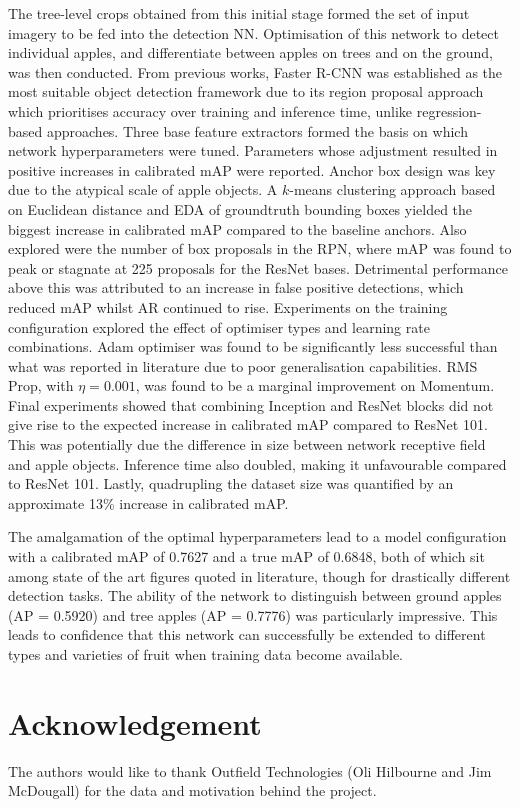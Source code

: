 \documentclass[journal]{IEEEtran}
\begin{document}
The tree-level crops obtained from this initial stage formed the set of input imagery to be fed into the detection NN. Optimisation of this network to detect individual apples, and differentiate between apples on trees and on the ground, was then conducted. 
From previous works, Faster R-CNN was established as the most suitable object detection framework due to its region proposal approach which prioritises accuracy over training and inference time, unlike regression-based approaches. Three base feature extractors formed the basis on which network hyperparameters were tuned. Parameters whose adjustment resulted in positive increases in calibrated mAP were reported. Anchor box design was key due to the atypical scale of apple objects. A $k$-means clustering approach based on Euclidean distance and EDA of groundtruth bounding boxes yielded the biggest increase in calibrated mAP compared to the baseline anchors. Also explored were the number of box proposals in the RPN, where mAP was found to peak or stagnate at 225 proposals for the ResNet bases. Detrimental performance above this was attributed to an increase in false positive detections, which reduced mAP whilst AR continued to rise. Experiments on the training configuration explored the effect of optimiser types and learning rate combinations. Adam optimiser was found to be significantly less successful than what was reported in literature due to poor generalisation capabilities. RMS Prop, with $\eta=0.001$, was found to be a marginal improvement on Momentum. Final experiments showed that combining Inception and ResNet blocks did not give rise to the expected increase in calibrated mAP compared to ResNet 101. This was potentially due the difference in size between network receptive field and apple objects. Inference time also doubled, making it unfavourable compared to ResNet 101. Lastly, quadrupling the dataset size was quantified by an approximate 13\% increase in calibrated mAP.

The amalgamation of the optimal hyperparameters lead to a model configuration with a calibrated mAP of 0.7627 and a true mAP of 0.6848, both of which sit among state of the art figures quoted in literature, though for drastically different detection tasks. The ability of the network to distinguish between ground apples (AP = 0.5920) and tree apples (AP = 0.7776) was particularly impressive. This leads to confidence that this network can successfully be extended to different types and varieties of fruit when training data become available.



















\section*{Acknowledgement}

The authors would like to thank Outfield Technologies (Oli Hilbourne and Jim McDougall) for the data and motivation behind the project.






 
\end{document}
